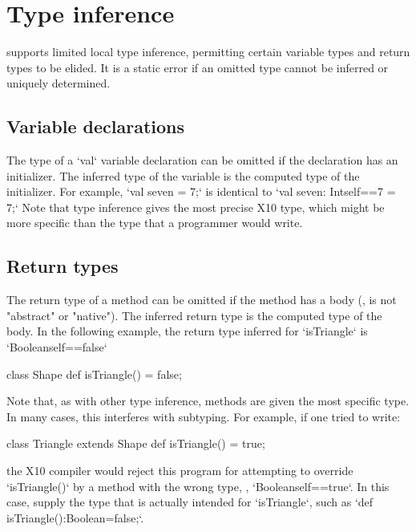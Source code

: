 {{\section{Type inference}
\label{TypeInference}

\XtenCurrVer{} supports limited local type inference, permitting
certain variable types and return types to be elided.
It is a static error if an omitted type cannot be inferred or
uniquely determined.

\subsection{Variable declarations}

The type of a \xcd`val` variable declaration can be omitted if the
declaration has an initializer.  The inferred type of the
variable is the computed type of the initializer.
For example, 
\xcd`val seven = 7;`
is identical to 
\xcd`val seven: Int{self==7} = 7;`
Note that type inference gives the most precise X10 type, which might be more
specific than the type that a programmer would write.


\subsection{Return types}

The return type of a method can be omitted if the method has a body (\ie, is
not \xcd"abstract" or \xcd"native"). The inferred return type is the computed
type of the body.  In the following example, the return type inferred for
\xcd`isTriangle` is 
\xcd`Boolean{self==false}`
\begin{xten}
class Shape {
  def isTriangle() = false; 
}  
\end{xten}
%
Note that, as with other type inference, methods are given the most specific
type.  In many cases, this interferes with subtyping.  For example, if one
tried to write: 
\begin{xten}
class Triangle extends Shape {
  def isTriangle() = true;
}
\end{xten}
\noindent
the X10 compiler would reject this program for attempting to override
\xcd`isTriangle()` by a method with the wrong type, \viz,
\xcd`Boolean{self==true}`.  In this case, supply the type that is actually
intended for \xcd`isTriangle`, such as \xcd`def isTriangle():Boolean=false;`. 

}}
